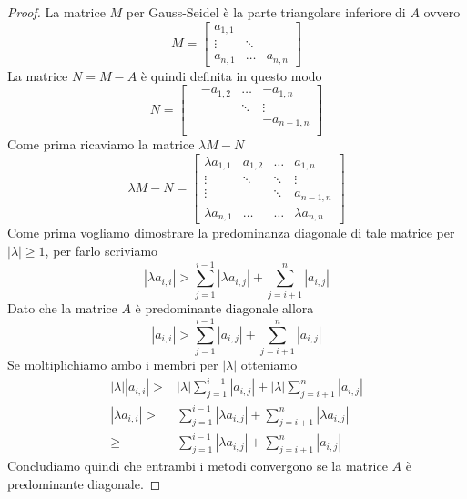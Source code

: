 \begin{theorem}
\begin{proof}
		La matrice $M$ per Gauss-Seidel è la parte triangolare inferiore di $A$ ovvero
		\[
			M = \begin{bmatrix}
				a_{1,1} &        &         \\
				\vdots  & \ddots &         \\
				a_{n,1} & \dots  & a_{n,n}
			\end{bmatrix}
		\]
		La matrice $N = M - A$ è quindi definita in questo modo
		\[
			N = \begin{bmatrix}
				 & -a_{1,2} & \dots  & -a_{1,n}    \\
				 &          & \ddots & \vdots      \\
				 &          &        & -a_{n-1, n} \\
				 &          &        &
			\end{bmatrix}
		\]
		Come prima ricaviamo la matrice $\lambda M - N$
		\[
			\lambda M - N = \begin{bmatrix}
				\lambda	a_{1,1}  & a_{1,2} & \dots  & a_{1,n}          \\
				\vdots          & \ddots  & \ddots & \vdots           \\
				\vdots          &         & \ddots & a_{n-1,n}        \\
				\lambda a_{n,1} & \dots   & \dots  & \lambda a_{n, n}
			\end{bmatrix}
		\]
		Come prima vogliamo dimostrare la predominanza diagonale di tale matrice per $|\lambda| \geq 1$, per
		farlo scriviamo
		\[ |\lambda a_{i,i}| > \sum_{j=1}^{i-1} |\lambda a_{i,j}| + \sum_{j=i+1}^n |a_{i,j}| \]
		Dato che la matrice $A$ è predominante diagonale allora
		\[ |a_{i,i}| > \sum_{j=1}^{i-1} |a_{i,j}| + \sum_{j=i+1}^n |a_{i,j}| \]
		Se moltiplichiamo ambo i membri per $|\lambda|$ otteniamo
		\begin{align*}
			|\lambda| |a_{i,i}| > & |\lambda| \sum_{j=1}^{i-1} |a_{i,j}| + |\lambda| \sum_{j=i+1}^n |a_{i,j}| \\
			|\lambda a_{i,i}| >   & \sum_{j=1}^{i-1} |\lambda a_{i,j}| + \sum_{j=i+1}^n |\lambda a_{i,j}|     \\
			\geq                  & \sum_{j=1}^{i-1} |\lambda a_{i,j}| + \sum_{j=i+1}^n |a_{i,j}|
		\end{align*}
		Concludiamo quindi che entrambi i metodi convergono se la matrice $A$ è predominante diagonale.
	\end{proof}
\end{theorem}

